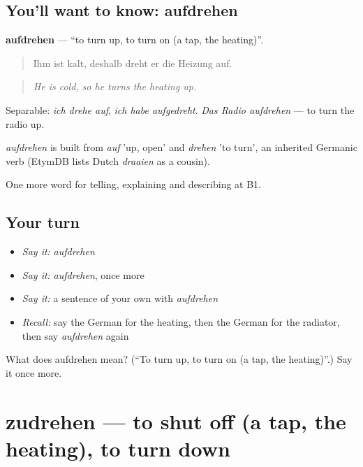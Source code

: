\subsection*{You'll want to know: aufdrehen}
\textbf{aufdrehen} — \textquotedblleft{}to turn up, to turn on (a tap, the heating)\textquotedblright{}.

\begin{quote}
Ihm ist kalt, deshalb dreht er die Heizung auf.
\end{quote}

\begin{quote}
\emph{He is cold, so he turns the heating up.}
\end{quote}

Separable: \emph{ich drehe auf}, \emph{ich habe aufgedreht}. \emph{Das Radio aufdrehen} — to turn the radio up.

\begin{cousinweb}
\emph{aufdrehen} is built from \emph{auf} 'up, open' and \emph{drehen} 'to turn', an inherited Germanic verb (EtymDB lists Dutch \emph{draaien} as a cousin).
\end{cousinweb}

\begin{grammarlens}[title={What you've built}]
One more word for telling, explaining and describing at B1.
\end{grammarlens}

\subsection*{Your turn}
\begin{itemize}
\raggedright
  \item \emph{Say it:} \emph{aufdrehen}
  \item \emph{Say it:} \emph{aufdrehen}, once more
  \item \emph{Say it:} a sentence of your own with \emph{aufdrehen}
  \item \emph{Recall:} say the German for the heating, then the German for the radiator, then say \emph{aufdrehen} again
\end{itemize}

\begin{tcolorbox}[breakable,colback=teal!4,colframe=teal!35!black,title={Before you move on}]
What does aufdrehen mean? (\textquotedblleft{}To turn up, to turn on (a tap, the heating)\textquotedblright{}.) Say it once more.
\end{tcolorbox}
\section[zudrehen]{zudrehen — to shut off (a tap, the heating), to turn down}

